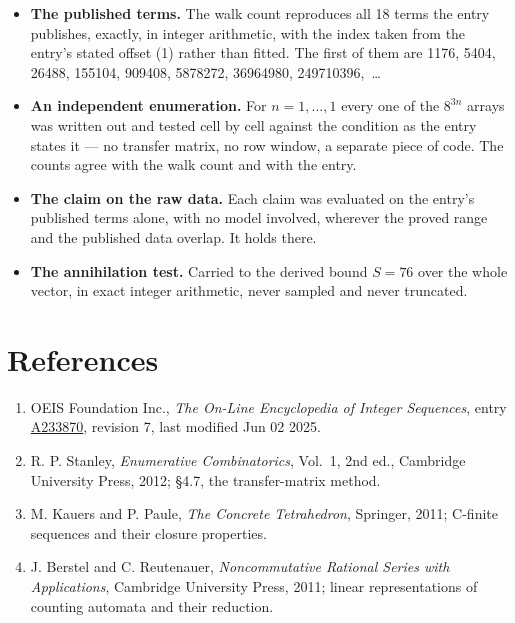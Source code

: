 \documentclass[11pt]{article}
\theoremstyle{definition}
\begin{document}
\begin{itemize}

\item {\bfseries The published terms.} The walk count reproduces all 18 terms the entry publishes, exactly, in integer arithmetic, with the index taken from the entry's stated offset (1) rather than fitted. The first of them are 1176, 5404, 26488, 155104, 909408, 5878272, 36964980, 249710396,~\dots

\item {\bfseries An independent enumeration.} For $n = 1,\dots,1$ every one of the $8^{3n}$ arrays was written out and tested cell by cell against the condition as the entry states it --- no transfer matrix, no row window, a separate piece of code. The counts agree with the walk count and with the entry.

\item {\bfseries The claim on the raw data.} Each claim was evaluated on the entry's published terms alone, with no model involved, wherever the proved range and the published data overlap. It holds there.

\item {\bfseries The annihilation test.} Carried to the derived bound $S = 76$ over the whole vector, in exact integer arithmetic, never sampled and never truncated.

\end{itemize}

\section{References}

\begin{enumerate}

\item OEIS Foundation Inc., \emph{The On-Line Encyclopedia of Integer Sequences}, entry \href{https://oeis.org/A233870}{A233870}, revision 7, last modified Jun 02 2025.

\item R. P. Stanley, \emph{Enumerative Combinatorics}, Vol.~1, 2nd ed., Cambridge University Press, 2012; \S4.7, the transfer-matrix method.

\item M. Kauers and P. Paule, \emph{The Concrete Tetrahedron}, Springer, 2011; C-finite sequences and their closure properties.

\item J. Berstel and C. Reutenauer, \emph{Noncommutative Rational Series with Applications}, Cambridge University Press, 2011; linear representations of counting automata and their reduction.

\end{enumerate}
\end{document}
